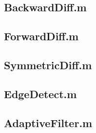 \documentclass[a4paper, 10pt, final]{article}
\begin{document}
\subsection{BackwardDiff.m}


\subsection{ForwardDiff.m}


\subsection{SymmetricDiff.m}


\subsection{EdgeDetect.m}


\subsection{AdaptiveFilter.m}

\end{document}
